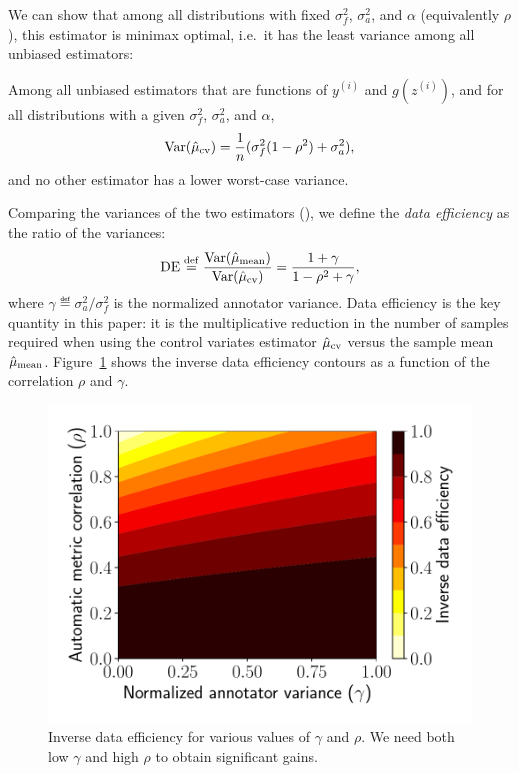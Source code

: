 We can show that among all distributions with
fixed $\sigma^2_f$, $\sigma^2_a$, and $\alpha$ (equivalently $\rho$), this estimator is minimax optimal, i.e.\ it has the least variance among all unbiased estimators:

\begin{theorem}
\label{thm:main}
Among all unbiased
  estimators that are functions of $y^{(i)}$ and $g(z^{(i)})$, and for all distributions with a given $\sigma^2_f$, $\sigma^2_a$, and $\alpha$,
\begin{align}
  \label{eqn:varcontrol}
  \operatorname{Var}(\hat \mu_\text{cv}) = \frac{1}{n} (\sigma^2_f (1 - \rho^2) + \sigma^2_a),
\end{align}
and no other estimator has a lower worst-case variance.
\end{theorem}

Comparing the variances of the two estimators (),
we define the \emph{data efficiency} as the ratio of the variances:
\begin{align}
\text{DE} \stackrel{\rm def}{=} \frac{\operatorname{Var}(\hat \mu_\text{mean})}{\operatorname{Var}(\hat \mu_\text{cv})} = \frac{1 + \gamma}{1-\rho^2 + \gamma},
\end{align}
where $\gamma \eqdef \sigma^2_a / \sigma^2_f$ is the normalized annotator variance.
Data efficiency is the key quantity in this paper:
  it is the multiplicative reduction in the number of samples required
  when using the control variates estimator $\hat \mu_\text{cv}$ versus the sample mean $\hat \mu_\text{mean}$.
Figure~\ref{fig:savings} shows the inverse data efficiency contours as a function of the correlation $\rho$
and $\gamma$.

\begin{figure}
\centering
  \includegraphics[width=\columnwidth]{figures/savings}
  \caption{\label{fig:savings} Inverse data efficiency for various values of
  $\gamma$ and $\rho$.  We need both low $\gamma$ and high $\rho$ to obtain
  significant gains.
  }
\end{figure}

